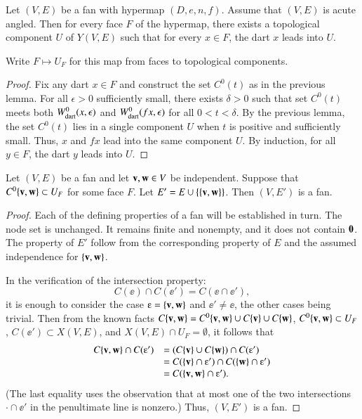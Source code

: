 \begin{lemma} \label{lemma:UF}
Let $(V,E)$ be a fan with hypermap $(D,e,n,f)$.   Assume that $(V,E)$ is acute angled.  Then for every face $F$ of the hypermap, there exists a topological component $U$ of $Y(V,E)$ such that for every $x\in F$, the dart $x$ leads into $U$. 
\end{lemma}
%
%
%

Write $F\mapsto U_F$ for this map from faces to topological components.
%

\begin{proof}  Fix any dart $x\in F$ and construct the set $C^0(t)$ as
in the previous lemma.  
For all $\epsilon>0$
sufficiently small, there exists $\delta>0$ such that set $C^0(t)$ meets
both $W^0_{\text{dart}}(x,\epsilon)$ and $W^0_{\text{dart}}(f x,\epsilon)$ for all $0<t<\delta$.  
By the previous lemma, the set $C^0(t)$ lies in a single
component $U$ when $t$ is positive and sufficiently small.  
Thus,
$x$ and $f x$ lead into the same component $U$.  By induction, for all
$y\in F$, the dart $y$ leads into $U$.
\end{proof}

\begin{lemma}\label{lemma:add-edge}
Let $(V,E)$ be a fan and let ${\mathbf v},{\mathbf w}\in V$ be independent.   Suppose that
$C^0\{{\mathbf v},{\mathbf w}\}\subset U_F$ for some face $F$.  Let $E' = E\cup\{\{{\mathbf v},{\mathbf w}\}\}$.  Then
$(V,E')$ is a fan.
\end{lemma}

\begin{proof} Each of the defining properties of a fan will be established in turn.
The node set is unchanged.  It remains finite and nonempty, and it does not contain ${\mathbf 0}$.  The property  of $E'$ follow from the corresponding property of $E$
and the assumed independence for $\{{\mathbf v},{\mathbf w}\}$.  

In the verification of the intersection property:
$$
C(\ee)\cap C(\ee') = C(\ee \cap \ee'),
$$
it is enough to consider the case $\ee = \{\v,\w\}$ and $\ee' \ne \ee$, the other cases being trivial.  Then from the known facts $C\{{\mathbf v},{\mathbf w}\} = C^0\{{\mathbf v},{\mathbf w}\}\cup C\{{\mathbf v}\}\cup C\{{\mathbf w}\}$, $C^0\{{\mathbf v},{\mathbf w}\}\subset U_F$,   $C(\ee')\subset X(V,E)$, and $X(V,E)\cap U_F=\emptyset$, it follows that
$$
\begin{array}{rll}
C\{\v,\w\} \cap C(\ee')  &= (C\{\v\} \cup C\{\w\}) \cap C(\ee') \\
  &= C(\{\v\}\cap \ee') \cap C(\{\w\}\cap \ee')\\
  &= C(\{\v,\w\}\cap \ee').
\end{array}
$$
(The last equality uses the observation that at most one of the two intersections $\cdot\cap\ee'$ in the penultimate line is nonzero.)
Thus, $(V,E')$ is a fan.
\end{proof}


